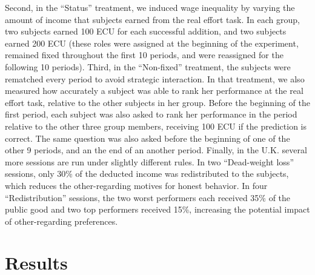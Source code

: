 \documentclass[12pt]{article}
\begin{document}
\par Second, in the ``Status'' treatment, we induced wage inequality by varying the amount of income that subjects earned from the real effort task. In each group, two subjects earned 100 ECU for each successful addition, and two subjects earned 200 ECU (these roles were  assigned at the beginning of the experiment, remained fixed throughout the first 10 periods, and were reassigned for the following 10 periods). Third, in the ``Non-fixed'' treatment, the subjects were rematched every period to avoid strategic interaction. In that treatment, we also measured how accurately a subject was able to rank her performance at the real effort task, relative to the other subjects in her group. Before the beginning of the first period, each subject was also asked to rank her performance in the period relative to the other three group members, receiving 100 ECU if the prediction is correct. The same question was also asked before the beginning of one of the other 9 periods, and an the end of an another period. Finally, in the U.K. several more sessions are run under slightly different rules. In two ``Dead-weight loss'' sessions, only 30\% of the deducted income was redistributed to the subjects, which reduces the other-regarding motives for honest behavior. In four ``Redistribution'' sessions, the two worst performers each received 35\% of the public good and two top performers received 15\%, increasing the potential impact of other-regarding preferences. \footnotemark{}

\section*{Results}


\end{document}

